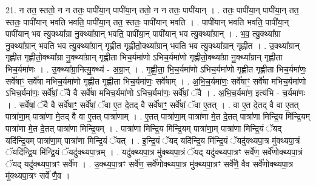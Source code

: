 \documentclass[17pt]{extarticle}
\begin{document}
21. न तत॒ स्ततो॒ न न ततः॒ पापी॑या॒न् पापी॑या॒न् ततो॒ न न ततः॒ पापी॑यान् । . ततः॒ पापी॑या॒न् पापी॑या॒न् तत॒ स्ततः॒ पापी॑यान् भवति भवति॒ पापी॑या॒न् तत॒ स्ततः॒ पापी॑यान् भवति । . पापी॑यान् भवति भवति॒ पापी॑या॒न् पापी॑यान् भव त्यु॒क्थ्या᳚ग्रा नु॒क्थ्या᳚ग्रान् भवति॒ पापी॑या॒न् पापी॑यान् भव त्यु॒क्थ्या᳚ग्रान् । . भ॒व॒ त्यु॒क्थ्या᳚ग्रा नु॒क्थ्या᳚ग्रान् भवति भव त्यु॒क्थ्या᳚ग्रान् गृह्णीत गृह्णीतो॒क्थ्या᳚ग्रान् भवति भव त्यु॒क्थ्या᳚ग्रान् गृह्णीत । . उ॒क्थ्या᳚ग्रान् गृह्णीत गृह्णीतो॒क्थ्या᳚ग्रा नु॒क्थ्या᳚ग्रान् गृह्णीता भिच॒र्यमा॑णो ऽभिच॒र्यमा॑णो गृह्णीतो॒क्थ्या᳚ग्रा नु॒क्थ्या᳚ग्रान् गृह्णीता भिच॒र्यमा॑णः । . उ॒क्थ्या᳚ग्रा॒नित्यु॒क्थ्य॑ - अ॒ग्रा॒न् । . गृ॒ह्णी॒ता॒ भि॒च॒र्यमा॑णो ऽभिच॒र्यमा॑णो गृह्णीत गृह्णीता भिच॒र्यमा॑णः॒ सर्वे॑षाꣳ॒॒ सर्वे॑षा मभिच॒र्यमा॑णो गृह्णीत गृह्णीता भिच॒र्यमा॑णः॒ सर्वे॑षाम् । . अ॒भि॒च॒र्यमा॑णः॒ सर्वे॑षाꣳ॒॒ सर्वे॑षा मभिच॒र्यमा॑णो ऽभिच॒र्यमा॑णः॒ सर्वे॑षां॒ ॅवै वै सर्वे॑षा मभिच॒र्यमा॑णो ऽभिच॒र्यमा॑णः॒ सर्वे॑षां॒ ॅवै । . अ॒भि॒च॒र्यमा॑ण॒ इत्य॑भि - च॒र्यमा॑णः । . सर्वे॑षां॒ ॅवै वै सर्वे॑षाꣳ॒॒ सर्वे॑षां॒ ॅवा ए॒त दे॒तद् वै सर्वे॑षाꣳ॒॒ सर्वे॑षां॒ ॅवा ए॒तत् । . वा ए॒त दे॒तद् वै वा ए॒तत् पात्रा॑णा॒म् पात्रा॑णा मे॒तद् वै वा ए॒तत् पात्रा॑णाम् । . ए॒तत् पात्रा॑णा॒म् पात्रा॑णा मे॒त दे॒तत् पात्रा॑णा मिन्द्रि॒य मि॑न्द्रि॒यम् पात्रा॑णा मे॒त दे॒तत् पात्रा॑णा मिन्द्रि॒यम् । . पात्रा॑णा मिन्द्रि॒य मि॑न्द्रि॒यम् पात्रा॑णा॒म् पात्रा॑णा मिन्द्रि॒यं ॅयद् यदि॑न्द्रि॒यम् पात्रा॑णा॒म् पात्रा॑णा मिन्द्रि॒यं ॅयत् । . इ॒न्द्रि॒यं ॅयद् यदि॑न्द्रि॒य मि॑न्द्रि॒यं ॅयदु॑क्थ्यपा॒त्र मु॑क्थ्यपा॒त्रं ॅयदि॑न्द्रि॒य मि॑न्द्रि॒यं ॅयदु॑क्थ्यपा॒त्रम् । . यदु॑क्थ्यपा॒त्र मु॑क्थ्यपा॒त्रं ॅयद् यदु॑क्थ्यपा॒त्रꣳ सर्वे॑ण॒ सर्वे॑णोक्थ्यपा॒त्रं ॅयद् यदु॑क्थ्यपा॒त्रꣳ सर्वे॑ण । . उ॒क्थ्य॒पा॒त्रꣳ सर्वे॑ण॒ सर्वे॑णोक्थ्यपा॒त्र मु॑क्थ्यपा॒त्रꣳ सर्वे॑णै॒ वैव सर्वे॑णोक्थ्यपा॒त्र मु॑क्थ्यपा॒त्रꣳ सर्वे॑ णै॒व । \newline
\end{document}
